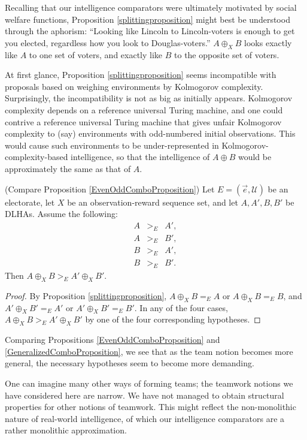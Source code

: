 \documentclass[twoside,11pt]{article}
\begin{document}
Recalling that our intelligence comparators were ultimately motivated by
social welfare functions,
Proposition \ref{splittingproposition} might best be understood through
the aphorism: ``Looking like Lincoln to Lincoln-voters is
enough to get you elected, regardless how you look to Douglas-voters.''
$A\oplus_X B$ looks exactly like $A$ to one set of voters, and exactly like
$B$ to the opposite set of voters.

At first glance, Proposition \ref{splittingproposition} seems incompatible with
proposals based on weighing environments by Kolmogorov complexity. Surprisingly,
the incompatibility is not as big as initially appears.
Kolmogorov complexity depends on a reference universal Turing machine, and one could
contrive a reference universal Turing machine that gives unfair Kolmogorov complexity
to (say) environments with odd-numbered initial observations. This would cause
such environments to be under-represented in Kolmogorov-complexity-based intelligence,
so that the intelligence of $A\oplus B$ would be approximately the same as that of
$A$.


\begin{proposition}
\label{GeneralizedComboProposition}
    (Compare Proposition \ref{EvenOddComboProposition})
    Let $E=(\vec{e},\mathscr U)$ be an electorate,
    let $X$ be an observation-reward sequence set,
    and let $A,A',B,B'$ be DLHAs.
    Assume the following:
    \begin{eqnarray*}
        A &{>_{E}}& A',\\
        A &{>_{E}}& B',\\
        B &{>_{E}}& A',\\
        B &{>_{E}}& B'.
    \end{eqnarray*}
    Then $A\oplus_X B>_{E} A'\oplus_X B'$.
\end{proposition}

\begin{proof}
    By Proposition \ref{splittingproposition},
    $A\oplus_X B =_{E}A$ or $A\oplus_X B =_{E}B$,
    and $A'\oplus_X B' =_{E}A'$ or $A'\oplus_X B' =_{E}B'$.
    In any of the four cases, $A\oplus_X B >_{E} A'\oplus_X B'$
    by one of the four corresponding hypotheses.
\end{proof}

Comparing Propositions \ref{EvenOddComboProposition} and \ref{GeneralizedComboProposition},
we see that as the team notion becomes more general, the necessary hypotheses
seem to become more demanding.

One can imagine many other ways of forming teams; the teamwork notions we have considered
here are narrow. We have not managed to obtain structural properties for other
notions of teamwork. This might reflect the non-monolithic nature of real-world
intelligence, of which our intelligence comparators are a rather monolithic approximation.
\end{document}
